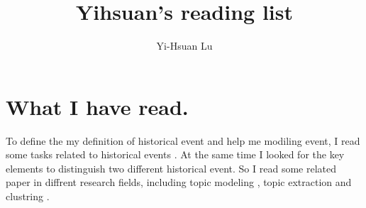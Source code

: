 \documentclass[a4paper]{article}
\title{\textbf{Yihsuan's reading list}}
\author{Yi-Hsuan Lu}
\begin{document}
\maketitle

\section{What I have read.}
To define the my definition of historical event and help me modiling event, I read some tasks related to historical events \cite{Cybulska:LREC10, Segers:ESWC11, Cybulska:LaTeCH11, Cybulska:RANLP13,Merono-Penuela:SWJ14}. At the same time I looked for the key elements to distinguish two different historical event. So I read some related paper in diffrent research fields, including topic modeling \cite{Hall:2008EMNLP, Yang:2011LaTeCH}, topic extraction \cite{Chen:IEEE07, He:ICDM07} and clustring \cite{Yang:CIS11, Hoonlor:CAI12}.

 

\end{document}

